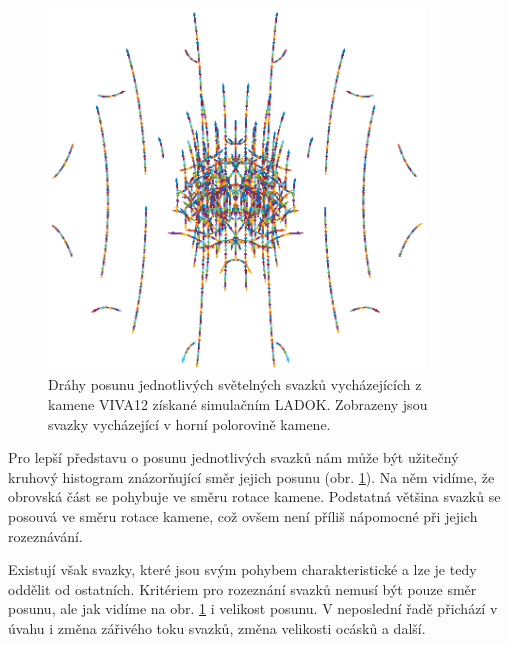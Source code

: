 \begin{figure}[h!]
\begin{center}
\includegraphics[width = 10cm]{figures/viva12_bigflux.eps}
\end{center}
\caption{Dráhy posunu jednotlivých světelných svazků vycházejících z kamene VIVA12 získané simulačním  LADOK. Zobrazeny jsou svazky vycházející v horní polorovině kamene. }

\label{fig:relativni pohyb graf}
\end{figure}

\newpage
Pro lepší představu o posunu jednotlivých svazků nám může být užitečný kruhový histogram znázorňující směr jejich posunu (obr. \ref{fig:relativni pohyb graf}). Na něm vidíme, že obrovská část se pohybuje ve směru rotace kamene. Podstatná většina svazků se posouvá ve směru rotace kamene, což ovšem není příliš nápomocné při jejich rozeznávání.

Existují však svazky, které jsou svým pohybem charakteristické a lze je tedy oddělit od ostatních. Kritériem pro rozeznání svazků nemusí být pouze směr posunu, ale jak vidíme na obr. \ref{fig:relativni pohyb graf} i velikost posunu. V neposlední řadě přichází v úvahu i změna zářivého toku svazků, změna velikosti ocásků a další. 

